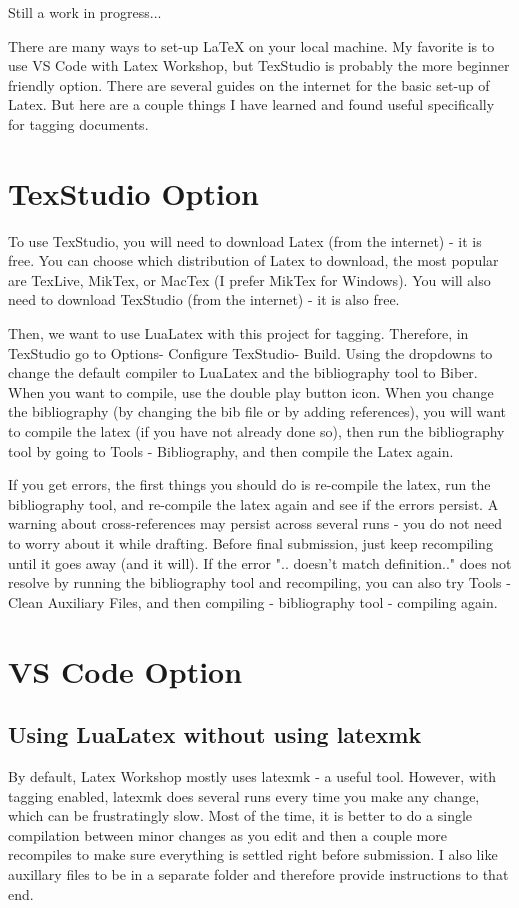 \documentclass{article}
\begin{document}
Still a work in progress...

There are many ways to set-up LaTeX on your local machine.
My favorite is to use VS Code with Latex Workshop, but TexStudio is probably the more beginner friendly option.
There are several guides on the internet for the basic set-up of Latex.
But here are a couple things I have learned and found useful specifically for tagging documents.

\section{TexStudio Option}
To use TexStudio, you will need to download Latex (from the internet) - it is free. You can choose which distribution of Latex to download, the most popular are TexLive, MikTex, or MacTex (I prefer MikTex for Windows).
You will also need to download TexStudio (from the internet) - it is also free.

Then, we want to use LuaLatex with this project for tagging. Therefore, in TexStudio go to Options- Configure TexStudio- Build. Using the dropdowns to change the default compiler to LuaLatex and the bibliography tool to Biber.
When you want to compile, use the double play button icon. When you change the bibliography (by changing the bib file or by adding references), you will want to compile the latex (if you have not already done so), then run the bibliography tool by going to Tools - Bibliography, and then compile the Latex again.

If you get errors, the first things you should do is re-compile the latex, run the bibliography tool, and re-compile the latex again and see if the errors persist.
A warning about cross-references may persist across several runs - you do not need to worry about it while drafting. Before final submission, just keep recompiling until it goes away (and it will).
If the error ".. doesn't match definition.." does not resolve by running the bibliography tool and recompiling, you can also try Tools - Clean Auxiliary Files, and then compiling - bibliography tool - compiling again.
\section{VS Code Option}
\subsection{Using LuaLatex without using latexmk}
By default, Latex Workshop mostly uses latexmk - a useful tool. However, with tagging enabled, latexmk does several runs every time you make any change, which can be frustratingly slow.
Most of the time, it is better to do a single compilation between minor changes as you edit and then a couple more recompiles to make sure everything is settled right before submission.
I also like auxillary files to be in a separate folder and therefore provide instructions to that end.
\end{document}
